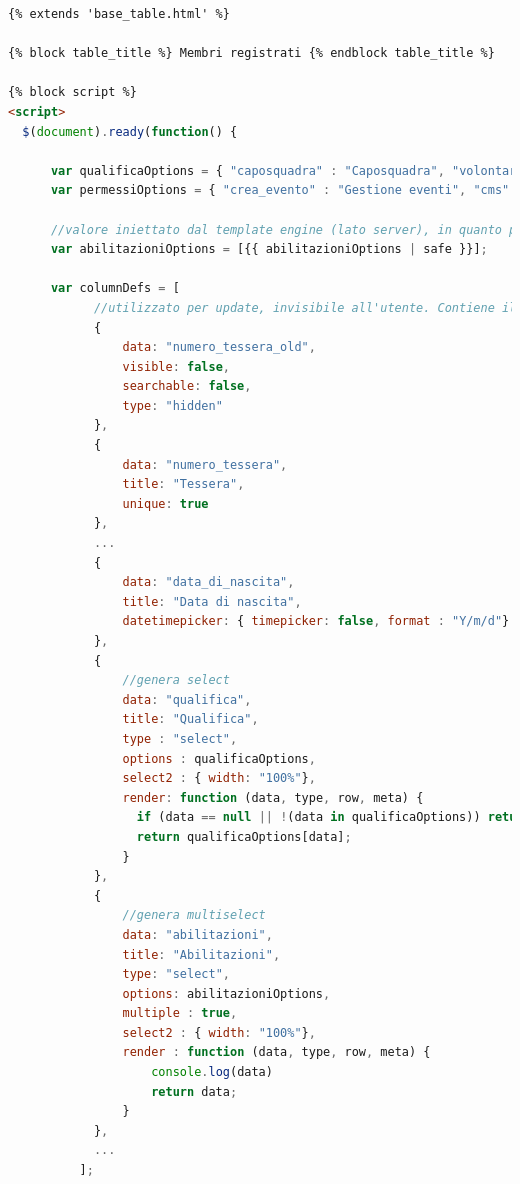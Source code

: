 \documentclass[12pt,a4paper,twoside,english,italian]{book}
\begin{document}
\begin{lstlisting}[language=html, caption=Esempio template - persona.html]
{% extends 'base_table.html' %} 

{% block table_title %} Membri registrati {% endblock table_title %} 

{% block script %}
<script>
  $(document).ready(function() {

      var qualificaOptions = { "caposquadra" : "Caposquadra", "volontario" : "Volontario" , "coordinatore" : "Coordinatore" };
      var permessiOptions = { "crea_evento" : "Gestione eventi", "cms" : "Gestione piattaforma" };
      
      //valore iniettato dal template engine (lato server), in quanto presi dal database
      var abilitazioniOptions = [{{ abilitazioniOptions | safe }}];

      var columnDefs = [
            //utilizzato per update, invisibile all'utente. Contiene il valore di "numero_tessera" prima della modifica.
            {
                data: "numero_tessera_old",
                visible: false,
                searchable: false,
                type: "hidden"
            },
            {
                data: "numero_tessera",
                title: "Tessera",
                unique: true
            },
            ...
            {
                data: "data_di_nascita",
                title: "Data di nascita",
                datetimepicker: { timepicker: false, format : "Y/m/d"}
            },
            {
                //genera select
                data: "qualifica",
                title: "Qualifica",
                type : "select",
                options : qualificaOptions,
                select2 : { width: "100%"},
                render: function (data, type, row, meta) {
                  if (data == null || !(data in qualificaOptions)) return null;
                  return qualificaOptions[data];
                }
            },
            {
                //genera multiselect
                data: "abilitazioni",
                title: "Abilitazioni",
                type: "select",
                options: abilitazioniOptions,
                multiple : true,
                select2 : { width: "100%"},
                render : function (data, type, row, meta) {
                    console.log(data)
                    return data;
                }
            },
            ...
          ];



\end{lstlisting}
\end{document}
